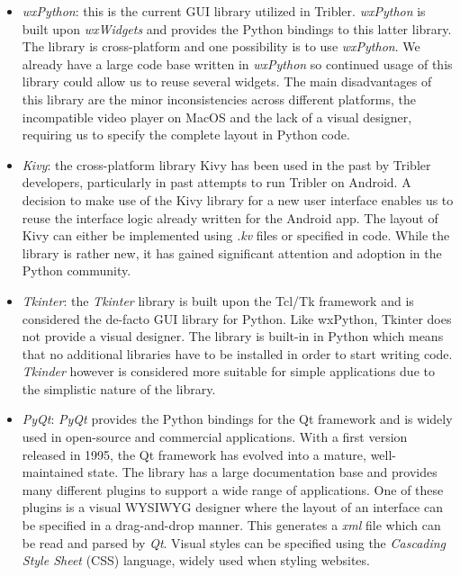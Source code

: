 \begin{itemize}
	\item \emph{wxPython}\cite{rappin2006wxpython}: this is the current GUI library utilized in Tribler. \emph{wxPython} is built upon \emph{wxWidgets} and provides the Python bindings to this latter library. The library is cross-platform and one possibility is to use \emph{wxPython}. We already have a large code base written in \emph{wxPython} so continued usage of this library could allow us to reuse several widgets. The main disadvantages of this library are the minor inconsistencies across different platforms, the incompatible video player on MacOS and the lack of a visual designer, requiring us to specify the complete layout in Python code.
	\item \emph{Kivy}\cite{solis2015kivy}: the cross-platform library Kivy has been used in the past by Tribler developers, particularly in past attempts to run Tribler on Android\cite{de2014android}\cite{sabee2014tribler}. A decision to make use of the Kivy library for a new user interface enables us to reuse the interface logic already written for the Android app. The layout of Kivy can either be implemented using \emph{.kv} files or specified in code. While the library is rather new, it has gained significant attention and adoption in the Python community.
	\item \emph{Tkinter}\cite{lundh1999introduction}: the \emph{Tkinter} library is built upon the Tcl/Tk framework and is considered the de-facto GUI library for Python. Like wxPython, Tkinter does not provide a visual designer. The library is built-in in Python which means that no additional libraries have to be installed in order to start writing code. \emph{Tkinder} however is considered more suitable for simple applications due to the simplistic nature of the library.
	\item \emph{PyQt}\cite{summerfield2007rapid}: \emph{PyQt} provides the Python bindings for the Qt framework and is widely used in open-source and commercial applications. With a first version released in 1995, the Qt framework has evolved into a mature, well-maintained state. The library has a large documentation base and provides many different plugins to support a wide range of applications. One of these plugins is a visual WYSIWYG designer where the layout of an interface can be specified in a drag-and-drop manner. This generates a \emph{xml} file which can be read and parsed by \emph{Qt}. Visual styles can be specified using the \emph{Cascading Style Sheet} (CSS) language, widely used when styling websites.
\end{itemize}
